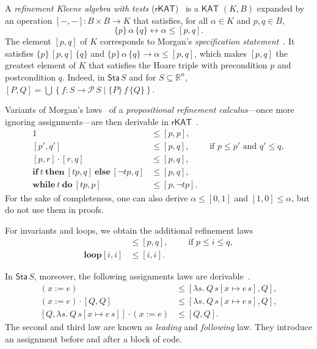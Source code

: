 \documentclass[envcountsame,envcountsect]{llncs}
\newcommand{\IF}[3]{\mathbf{if}\ #1\ \mathbf{then}\ #2\ \mathbf{else}\ #3}
\newcommand{\WHILE}[2]{\mathbf{while}\ #1\ \mathbf{do}\ #2}
\newcommand{\KAT}{\mathsf{KAT}}
\newcommand{\rKAT}{\mathsf{rKAT}}
\newcommand{\Pow}{\mathcal{P}}
\newcommand{\reals}{\mathbb{R}}
\newcommand{\sta}{\mathsf{Sta}}
\begin{document}
A \emph{refinement Kleene algebra with tests}
($\rKAT$)~\cite{ArmstrongGS16}  is a $\KAT$
$(K,B)$ expanded by an operation $[-,-]:B\times B\to K$ that
satisfies, for all $\alpha \in K$ and $p,q\in B$, 
\begin{equation*}
  \{p\}\, \alpha\, \{q\} \leftrightarrow \alpha\le [p,q].
\end{equation*}
The element $[p,q]$ of $K$ corresponds to Morgan's \emph{specification
  statement}~\cite{Morgan94}. It satisfies $\{p\}\, [p,q]\, \{q\}$
and $\{p\}\, \alpha\, \{q\} \rightarrow \alpha\le [p,q]$, 
which makes $[p,q]$ the greatest element of $K$ that satisfies the Hoare
triple with precondition $p$ and postcondition $q$.  Indeed, in
$\sta\, S$ and for $S\subseteq \reals^n$,
$ [P,Q] = \bigcup \left\{f:S\to \Pow\, S \mid \{P\}\, f\,
  \{Q\}\right\}$. 

Variants of Morgan's laws~\cite{Morgan94} of a \emph{propositional
  refinement calculus}---once more ignoring assignments---are then derivable in
$\rKAT$~\cite{ArmstrongGS16}.
\begin{align}
  1 &\le [p,p],\label{eq:r-skip}\tag{r-skip}\\
[p',q'] &\le [p,q],\qquad \text{ if } p\le p'\text{ and } q'\le q,\label{eq:r-cons}\tag{r-cons}\\
[p,r]\cdot [r,q] &\le [p,q],\label{eq:r-seq}\tag{r-seq}\\
\IF{t}{[tp,q]}{[\neg tp,q]} &\le [p,q],\label{eq:r-cond}\tag{r-cond}\\
 \WHILE{t}{[tp,p]} &\le [p,\neg tp]. \label{eq:r-while}\tag{r-while}
\end{align}
For the sake of completeness, one can also derive $\alpha \le [0,1]$ and $[1,0] \le \alpha$, but do not use them in proofs.

For invariants and loops, we obtain the additional refinement laws
\begin{align}
  [i,i] &\le [p,q],\qquad \text{ if } p\le i \le q,\label{eq:r-inv}\tag{r-inv}\\
\mathbf{loop} [i,i] &\le [i,i]. \label{eq:r-loop}\tag{r-loop}
\end{align}

In $\sta\, S$, moreover, the following assignments laws are
derivable~\cite{ArmstrongGS16}.
\begin{align}
 (x := e)  &\le  \left[\lambda s.\ Q\, s[x\mapsto e\, s],Q\right],\label{eq:r-assgn}\tag{r-assgn}\\
(x:= e) \cdot \left[Q,Q\right] &\le [\lambda s.\ Q\, s[x\mapsto e\, s],Q],\label{eq:r-assgn}\tag{r-assgnl}\\
\left[Q,\lambda s.\ Q\, s[x\mapsto e\, s]\right]\cdot (x:=e) &\le [Q,Q]. \label{eq:r-assgn}\tag{r-assgnf}
\end{align}
The second and third law are known as \emph{leading} and \emph{following}
law. They introduce an assignment before and after a block of code. 
\end{document}
